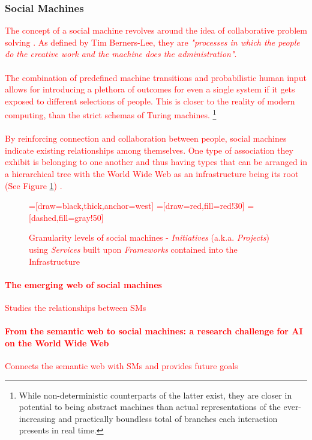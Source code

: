 \documentclass[12pt,a4,xcolor=table]{article}
\begin{document}
	\subsubsection{Social Machines}
	
\textcolor{red}{
	The concept of a social machine revolves around the idea of collaborative problem solving \cite{Luczak-Rosch2015}. As defined by  Tim Berners-Lee, they are \textit{"processes in which the people do the creative work and the machine does the administration"}\cite{berners2001weaving}.\\\\The combination of predefined machine transitions and probabilistic human input allows for introducing a plethora of outcomes for even a single system if it gets exposed to different selections of people. This is closer to the reality of modern computing, than the strict schemas of Turing machines. \footnote{While non-deterministic counterparts of the latter exist, they are closer in potential to being abstract machines than actual representations of the ever-increasing and practically boundless total of branches each interaction presents in real time.}\\\\By reinforcing connection and collaboration between people, social machines indicate existing relationships among themselves. One type of association they exhibit is belonging to one another and thus having types that can be arranged in a hierarchical tree with the World Wide Web as an infrastructure being its root (See Figure \ref{fig:sm-tree}) \cite{Shadbolt2009}.	
	\begin{figure}
		\centering
		=[draw=black,thick,anchor=west]
		=[draw=red,fill=red!30]
		=[dashed,fill=gray!50]
		\caption{Granularity levels of social machines - \textit{Initiatives} (a.k.a. \textit{Projects}) using \textit{Services} built upon \textit{Frameworks} contained into the Infrastructure}
		\label{fig:sm-tree}
	\end{figure}
}
\textcolor{red}{
	\paragraph{The emerging web of social machines}
	Studies the relationships between SMs\cite{Silvio2010}
	\paragraph{From the semantic web to social machines: a research challenge for AI on the World Wide Web}
	Connects the semantic web with SMs and provides future goals\cite{Hendler2009}
}
\end{document}
